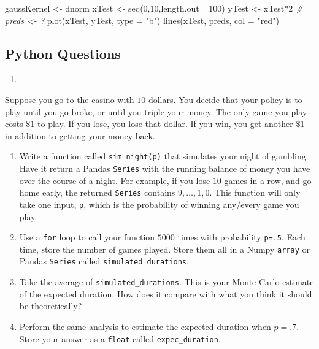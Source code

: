 \documentclass[
  12pt,
  krantz2]{krantz}
\makeatletter
\newenvironment{Shaded}{\begin{snugshade}}{\end{snugshade}}
\newcommand{\AttributeTok}[1]{\textcolor[rgb]{0.61,0.61,0.61}{#1}}
\newcommand{\CommentTok}[1]{\textcolor[rgb]{0.37,0.37,0.37}{\textit{#1}}}
\newcommand{\DecValTok}[1]{\textcolor[rgb]{0.06,0.06,0.06}{#1}}
\newcommand{\FunctionTok}[1]{\textcolor[rgb]{0,0,0}{#1}}
\newcommand{\NormalTok}[1]{#1}
\newcommand{\OtherTok}[1]{\textcolor[rgb]{0.37,0.37,0.37}{#1}}
\newcommand{\SpecialCharTok}[1]{\textcolor[rgb]{0,0,0}{#1}}
\newcommand{\StringTok}[1]{\textcolor[rgb]{0.5,0.5,0.5}{#1}}
\providecommand{\tightlist}{%
  \setlength{\itemsep}{0pt}\setlength{\parskip}{0pt}}
\newenvironment{kframe}{%
\medskip{}
\setlength{\fboxsep}{.8em}
 \def\at@end@of@kframe{}%
 \ifinner\ifhmode%
  \def\at@end@of@kframe{\end{minipage}}%
  \begin{minipage}{\columnwidth}%
 \fi\fi%
 \def\FrameCommand##1{\hskip\@totalleftmargin \hskip-\fboxsep
 \colorbox{shadecolor}{##1}\hskip-\fboxsep
     \hskip-\linewidth \hskip-\@totalleftmargin \hskip\columnwidth}%
 \MakeFramed {\advance\hsize-\width
   \@totalleftmargin\z@ \linewidth\hsize
   \@setminipage}}%
 {\par\unskip\endMakeFramed%
 \at@end@of@kframe}
\renewenvironment{Shaded}{\begin{kframe}}{\end{kframe}}
\makeatother
\begin{document}
\begin{Shaded}
\begin{Highlighting}[]
\NormalTok{gaussKernel }\OtherTok{\textless{}{-}}\NormalTok{ dnorm}
\NormalTok{xTest }\OtherTok{\textless{}{-}} \FunctionTok{seq}\NormalTok{(}\DecValTok{0}\NormalTok{,}\DecValTok{10}\NormalTok{,}\AttributeTok{length.out=} \DecValTok{100}\NormalTok{)}
\NormalTok{yTest }\OtherTok{\textless{}{-}}\NormalTok{ xTest}\SpecialCharTok{*}\DecValTok{2} 
\CommentTok{\# preds \textless{}{-} ?}
\FunctionTok{plot}\NormalTok{(xTest, yTest, }\AttributeTok{type =} \StringTok{"b"}\NormalTok{)}
\FunctionTok{lines}\NormalTok{(xTest, preds, }\AttributeTok{col =} \StringTok{"red"}\NormalTok{)}
\end{Highlighting}
\end{Shaded}

\hypertarget{python-questions-8}{%
\subsection{Python Questions}\label{python-questions-8}}

\begin{enumerate}
\def\labelenumi{\arabic{enumi}.}
\tightlist
\item
\end{enumerate}

Suppose you go to the casino with \(10\) dollars. You decide that your policy is to play until you go broke, or until you triple your money. The only game you play costs \(\$1\) to play. If you lose, you lose that dollar. If you win, you get another \(\$1\) in addition to getting your money back.

\begin{enumerate}
\def\labelenumi{\alph{enumi})}
\tightlist
\item
  Write a function called \texttt{sim\_night(p)} that simulates your night of gambling. Have it return a Pandas \texttt{Series} with the running balance of money you have over the course of a night. For example, if you lose \(10\) games in a row, and go home early, the returned \texttt{Series} contains \(9, \ldots, 1,0\). This function will only take one input, \texttt{p}, which is the probability of winning any/every game you play.
\item
  Use a \texttt{for} loop to call your function \(5000\) times with probability \texttt{p=.5}. Each time, store the number of games played. Store them all in a Numpy \texttt{array} or Pandas \texttt{Series} called \texttt{simulated\_durations}.
\item
  Take the average of \texttt{simulated\_durations}. This is your Monte Carlo estimate of the expected duration. How does it compare with what you think it should be theoretically?
\item
  Perform the same analysis to estimate the expected duration when \(p=.7\). Store your answer as a \texttt{float} called \texttt{expec\_duration}.
\end{enumerate}
\end{document}
